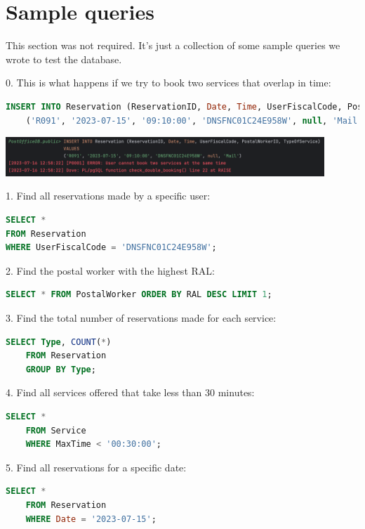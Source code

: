 \documentclass{article}
\begin{document}
\section{Sample queries}
This section was not required. It's just a collection of some sample queries we wrote to test the database.

0. This is what happens if we try to book two services that overlap in time:
\begin{lstlisting}[language=SQL]
    INSERT INTO Reservation (ReservationID, Date, Time, UserFiscalCode, PostalWorkerID, TypeOfService) VALUES
    ('R091', '2023-07-15', '09:10:00', 'DNSFNC01C24E958W', null, 'Mail');
\end{lstlisting}
\begin{center}
    \includegraphics[width=12cm]{images/trigger.png}
\end{center}
1. Find all reservations made by a specific user:

\begin{lstlisting}[language=SQL]
SELECT *
FROM Reservation
WHERE UserFiscalCode = 'DNSFNC01C24E958W';
\end{lstlisting}

2. Find the postal worker with the highest RAL\@:

\begin{lstlisting}[language=SQL]
    SELECT * FROM PostalWorker ORDER BY RAL DESC LIMIT 1;
\end{lstlisting}

3. Find the total number of reservations made for each service:

\begin{lstlisting}[language=SQL]
    SELECT Type, COUNT(*)
    FROM Reservation
    GROUP BY Type;
\end{lstlisting}

4. Find all services offered that take less than 30 minutes:

\begin{lstlisting}[language=SQL]
    SELECT *
    FROM Service
    WHERE MaxTime < '00:30:00';
\end{lstlisting}

5. Find all reservations for a specific date:

\begin{lstlisting}[language=SQL]
    SELECT *
    FROM Reservation
    WHERE Date = '2023-07-15';
\end{lstlisting}
\end{document}
